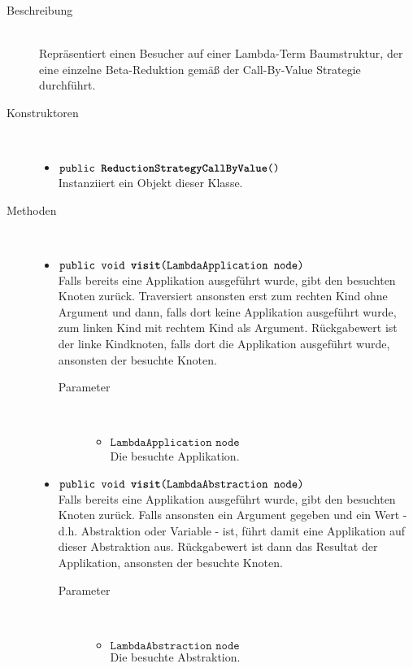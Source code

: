 \begin{description}
\item[Beschreibung] \hfill \\ Repräsentiert einen Besucher auf einer Lambda-Term Baumstruktur, der eine einzelne Beta-Reduktion gemäß der Call-By-Value Strategie durchführt.

\item[Konstruktoren] \hfill \\
	\vspace{-.8cm}
	\begin{itemize}
		\item $\texttt{public \textbf{ReductionStrategyCallByValue}()}$ \\ Instanziiert ein Objekt dieser Klasse.
	\end{itemize}

\item[Methoden] \hfill \\
	\vspace{-.8cm}
	\begin{itemize}
		\item $\texttt{public void \textbf{visit}(LambdaApplication node)}$ \\ Falls bereits eine Applikation ausgeführt wurde, gibt den besuchten Knoten zurück. Traversiert ansonsten erst zum rechten Kind ohne Argument und dann, falls dort keine Applikation ausgeführt wurde, zum linken Kind mit rechtem Kind als Argument. Rückgabewert ist der linke Kindknoten, falls dort die Applikation ausgeführt wurde, ansonsten der besuchte Knoten.
		\begin{description}
			\item[Parameter] \hfill \\
			\vspace{-.8cm}
			\begin{itemize}
				\item $\texttt{LambdaApplication node}$ \\ Die besuchte Applikation.
			\end{itemize}
		\end{description}
		
		\item $\texttt{public void \textbf{visit}(LambdaAbstraction node)}$ \\ Falls bereits eine Applikation ausgeführt wurde, gibt den besuchten Knoten zurück. Falls ansonsten ein Argument gegeben und ein Wert - d.h. Abstraktion oder Variable - ist, führt damit eine Applikation auf dieser Abstraktion aus. Rückgabewert ist dann das Resultat der Applikation, ansonsten der besuchte Knoten.
		\begin{description}
			\item[Parameter] \hfill \\
			\vspace{-.8cm}
			\begin{itemize}
				\item $\texttt{LambdaAbstraction node}$ \\ Die besuchte Abstraktion.
			\end{itemize}
		\end{description}
	\end{itemize}
\end{description}

